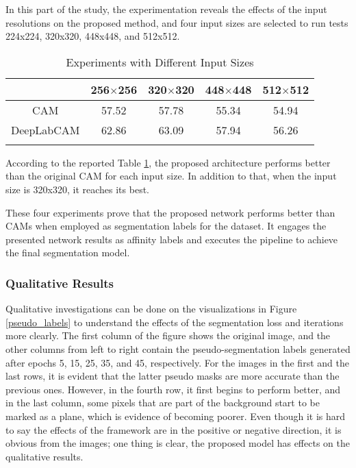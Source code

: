 \documentclass[sn-mathphys]{sn-jnl}
\theoremstyle{thmstyleone}
\theoremstyle{thmstyletwo}\newtheorem{example}{Example}\newtheorem{remark}{Remark}
\theoremstyle{thmstylethree}\newtheorem{definition}{Definition}
\begin{document}
In this part of the study, the experimentation reveals the effects of the input resolutions on the proposed method, and four input sizes are selected to run tests 224x224, 320x320, 448x448, and 512x512.

\begin{table}[!ht]
    \begin{center}
    \begin{minipage}{\textwidth}
    \caption{Experiments with Different Input Sizes}\label{resolutions}\begin{tabular*}{\textwidth}{@{\extracolsep{\fill}}ccccc@{\extracolsep{\fill}}}
    \toprule & 256$\times$256 & 320$\times$320 & 448$\times$448 & 512$\times$512 \\
    \midrule
    CAM & 57.52 & 57.78 & 55.34 & 54.94 \\
    DeepLabCAM & 62.86 & 63.09 & 57.94 & 56.26 \\
    
    \botrule
    \end{tabular*}
    \end{minipage}
    \end{center}
\end{table}

According to the reported Table \ref{resolutions}, the proposed architecture performs better than the original CAM for each input size. In addition to that, when the input size is 320x320, it reaches its best.


These four experiments prove that the proposed network performs better than CAMs when employed as segmentation labels for the dataset. It engages the presented network results as affinity labels and executes the pipeline to achieve the final segmentation model.  


\subsubsection{Qualitative Results}

Qualitative investigations can be done on the visualizations in Figure \ref{pseudo_labels} to understand the effects of the segmentation loss and iterations more clearly. The first column of the figure shows the original image, and the other columns from left to right contain the pseudo-segmentation labels generated after epochs 5, 15, 25, 35, and 45, respectively. For the images in the first and the last rows, it is evident that the latter pseudo masks are more accurate than the previous ones. However, in the fourth row, it first begins to perform better, and in the last column, some pixels that are part of the background start to be marked as a plane, which is evidence of becoming poorer. Even though it is hard to say the effects of the framework are in the positive or negative direction, it is obvious from the images; one thing is clear, the proposed model has effects on the qualitative results. 
\end{document}
